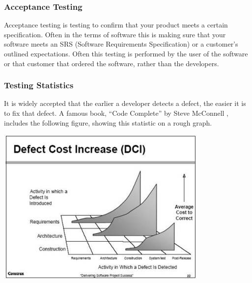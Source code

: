 \documentclass[11pt]{article}
\newenvironment{Figure}
  {\par\medskip\noindent\minipage{\linewidth}}
  {\endminipage\par\medskip}
\begin{document}
\subsubsection{Acceptance Testing}
Acceptance testing is testing to confirm that your product meets a certain specification. Often in the terms of software this is making sure that your software meets an SRS (Software Requirements Specification) or a customer's outlined expectations. Often this testing is performed by the user of the software or that customer that ordered the software, rather than the developers.

\subsubsection{Testing Statistics}
It is widely accepted that the earlier a developer detects a defect, the easier it is to fix that defect. A famous book, ``Code Complete'' by Steve McConnell \cite{DefectPic}, includes the following figure, showing this statistic on a rough graph.

\begin{Figure}
	\centering
	\includegraphics[width=0.75\linewidth]{defectcost.jpg} 
\end{Figure}

\end{document}
